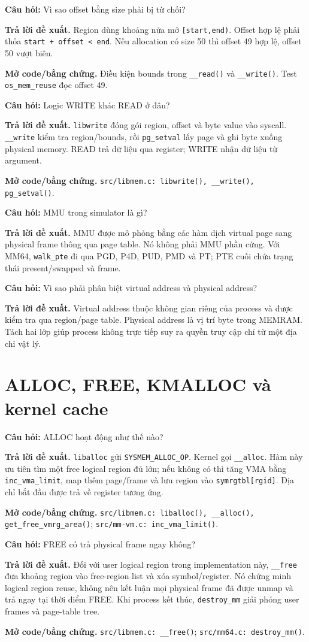 \documentclass[11pt,a4paper]{article}
\newcommand{\code}[1]{\texttt{\color{navy}#1}}
\newcommand{\q}[1]{%
  \vspace{0.55em}\noindent
  \colorbox{pale}{\parbox{\dimexpr\textwidth-2\fboxsep}{\textbf{\color{navy}Câu hỏi:} #1}}%
  \par\vspace{0.3em}}
\newcommand{\ans}[1]{\textbf{\color{cyan}Trả lời đề xuất.} #1\par}
\newcommand{\proofcode}[1]{\textbf{\color{orange}Mở code/bằng chứng.} #1\par}
\begin{document}
\q{Vì sao offset bằng size phải bị từ chối?}
\ans{Region dùng khoảng nửa mở \code{[start,end)}. Offset hợp lệ phải thỏa
\code{start + offset < end}. Nếu allocation có size 50 thì offset 49 hợp lệ,
offset 50 vượt biên.}
\proofcode{Điều kiện bounds trong \code{\_\_read()} và \code{\_\_write()}.
Test \code{os\_mem\_reuse} đọc offset 49.}

\q{Logic WRITE khác READ ở đâu?}
\ans{\code{libwrite} đóng gói region, offset và byte value vào syscall.
\code{\_\_write} kiểm tra region/bounds, rồi \code{pg\_setval} lấy page và ghi
byte xuống physical memory. READ trả dữ liệu qua register; WRITE nhận dữ liệu
từ argument.}
\proofcode{\code{src/libmem.c: libwrite(), \_\_write(), pg\_setval()}.}

\q{MMU trong simulator là gì?}
\ans{MMU được mô phỏng bằng các hàm dịch virtual page sang physical frame thông
qua page table. Nó không phải MMU phần cứng. Với MM64, \code{walk\_pte} đi qua
PGD, P4D, PUD, PMD và PT; PTE cuối chứa trạng thái present/swapped và frame.}

\q{Vì sao phải phân biệt virtual address và physical address?}
\ans{Virtual address thuộc không gian riêng của process và được kiểm tra qua
region/page table. Physical address là vị trí byte trong MEMRAM. Tách hai lớp
giúp process không trực tiếp suy ra quyền truy cập chỉ từ một địa chỉ vật lý.}

\section{ALLOC, FREE, KMALLOC và kernel cache}

\q{ALLOC hoạt động như thế nào?}
\ans{\code{liballoc} gửi \code{SYSMEM\_ALLOC\_OP}. Kernel gọi
\code{\_\_alloc}. Hàm này ưu tiên tìm một free logical region đủ lớn; nếu không
có thì tăng VMA bằng \code{inc\_vma\_limit}, map thêm page/frame và lưu region
vào \code{symrgtbl[rgid]}. Địa chỉ bắt đầu được trả về register tương ứng.}
\proofcode{\code{src/libmem.c: liballoc(), \_\_alloc(),
get\_free\_vmrg\_area()}; \code{src/mm-vm.c: inc\_vma\_limit()}.}

\q{FREE có trả physical frame ngay không?}
\ans{Đối với user logical region trong implementation này, \code{\_\_free}
đưa khoảng region vào free-region list và xóa symbol/register. Nó chứng minh
logical region reuse, không nên kết luận mọi physical frame đã được unmap và
trả ngay tại thời điểm FREE. Khi process kết thúc, \code{destroy\_mm} giải phóng
user frames và page-table tree.}
\proofcode{\code{src/libmem.c: \_\_free()}; \code{src/mm64.c: destroy\_mm()}.}
\end{document}
